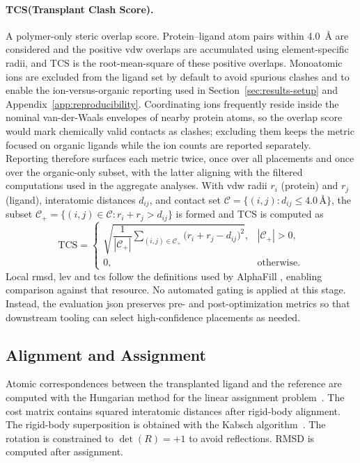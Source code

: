 \paragraph{TCS(Transplant Clash Score).} A polymer-only steric overlap
score. Protein–ligand atom pairs within 4.0~\AA{} are considered and
the positive \gls{vdw} overlaps are accumulated using element-specific
radii, and TCS is the root-mean-square of these positive overlaps. Monoatomic
ions are excluded from the ligand set by default to avoid spurious clashes and to enable the ion-versus-organic reporting used in Section~\ref{sec:results-setup} and Appendix~\ref{app:reproducibility}. Coordinating ions frequently reside inside the nominal van-der-Waals envelopes of nearby protein atoms, so the overlap score would mark chemically valid contacts as clashes; excluding them keeps the metric focused on organic ligands while the ion counts are reported separately. Reporting therefore surfaces each metric twice, once over all placements and once over the organic-only subset, with the latter aligning with the filtered computations used in the aggregate analyses. With \gls{vdw} radii \(r_i\) (protein) and \(r_j\) (ligand), interatomic distances \(d_{ij}\), and contact set
\(\mathcal{C} = \{(i,j) : d_{ij} \leq 4.0\,\text{\AA}\}\), the subset
\(\mathcal{C}_+ = \{(i,j) \in \mathcal{C} : r_i + r_j > d_{ij}\}\) is formed and TCS is computed as
\begin{equation}
    \mathrm{TCS} =
    \begin{cases}
        \sqrt{\dfrac{1}{|\mathcal{C}_+|} \sum\limits_{(i,j) \in \mathcal{C}_+} \bigl(r_i + r_j - d_{ij}\bigr)^2}, & |\mathcal{C}_+| > 0, \\
        0,                                                                                                        & \text{otherwise.}
    \end{cases}
\end{equation}
Local \gls{rmsd}, \gls{lev} and \gls{tcs} follow the definitions used by AlphaFill \cite{hekkelmanAlphaFillEnrichingAlphaFold2023}, enabling comparison against that resource.
No automated gating is applied at this stage. Instead, the evaluation \gls{json} preserves pre- and post-optimization metrics so that downstream tooling can select high-confidence placements as needed.

\subsection{Alignment and Assignment}
Atomic correspondences between the transplanted ligand and the reference are computed with the Hungarian method for the linear assignment problem~\cite{kuhnHungarianMethodAssignment1955c,munkresAlgorithmsAssignmentTransportation1957}. The cost matrix contains squared interatomic distances after rigid-body alignment. The rigid-body superposition is obtained with the Kabsch algorithm~\cite{kabschSolutionBestRotation1976a,kabschDiscussionSolutionBest1978}. The rotation is constrained to $\det(R)=+1$ to avoid reflections. RMSD is computed after assignment.

